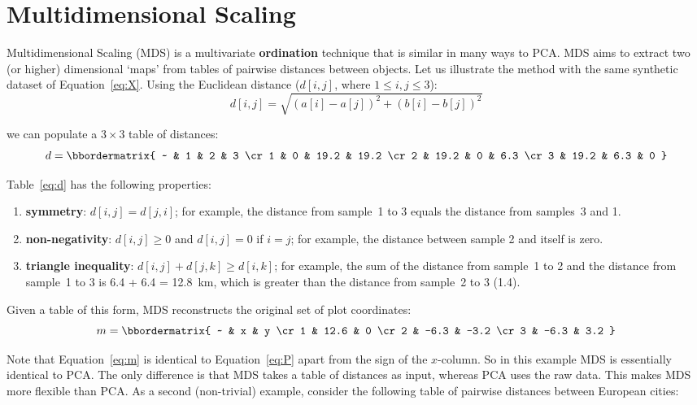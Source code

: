 \section{Multidimensional Scaling}
\label{sec:MDS}

Multidimensional Scaling (MDS) is a multivariate \textbf{ordination}
technique that is similar in many ways to PCA. MDS aims to extract two
(or higher) dimensional `maps' from tables of pairwise distances
between objects. Let us illustrate the method with the same synthetic
dataset of Equation~\ref{eq:X}. Using the Euclidean distance
($d[i,j]$, where $1\leq{i,j}\leq{3}$):
\begin{equation}
  d[i,j] = \sqrt{(a[i]-a[j])^2 + (b[i]-b[j])^2}
  \label{eq:euclidean}
\end{equation}

\noindent we can populate a ${3}\times{3}$ table of distances:
\begin{equation}
  d = \bbordermatrix{
    ~ & 1    & 2    & 3 \cr
    1 & 0    & 19.2 & 19.2 \cr
    2 & 19.2 & 0    & 6.3 \cr
    3 & 19.2 & 6.3  & 0
  }
  \label{eq:d}
\end{equation}

Table~\ref{eq:d} has the following properties:

\begin{enumerate}
\item{\bf symmetry}: $d[i,j]=d[j,i]$; for example, the distance from
  sample~1 to 3 equals the distance from samples~3 and 1.
\item{\bf non-negativity}: $d[i,j]\geq{0}$ and $d[i,j]=0$ if $i=j$;
  for example, the distance between sample 2 and itself is zero.
\item{\bf triangle inequality}: $d[i,j]+d[j,k]\geq{d[i,k]}$; for
  example, the sum of the distance from sample~1 to 2 and the
  distance from sample~1 to 3 is 6.4 + 6.4 = 12.8~km, which is
  greater than the distance from sample~2 to 3 (1.4).
\end{enumerate}

Given a table of this form, MDS reconstructs the original set of plot
coordinates:
\begin{equation}
  m = \bbordermatrix{
    ~ & x    & y \cr
    1 & 12.6 &  0 \cr
    2 & -6.3 & -3.2 \cr
    3 & -6.3 &  3.2 
  }
  \label{eq:m}
\end{equation}

Note that Equation~\ref{eq:m} is identical to Equation~\ref{eq:P}
apart from the sign of the $x$-column.  So in this example MDS is
essentially identical to PCA. The only difference is that MDS takes a
table of distances as input, whereas PCA uses the raw data. This makes
MDS more flexible than PCA. As a second (non-trivial) example,
consider the following table of pairwise distances between European
cities:

